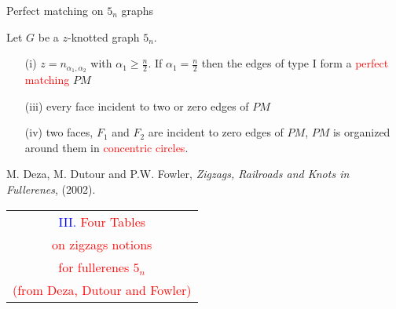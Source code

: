\documentclass[%
pdf,
colorBG,
slideColor,
]{prosper}
\begin{document}
\begin{slide}{Perfect matching on $5_n$ graphs}
\begin{center}
\begin{minipage}{57mm}
{\scriptsize
Let $G$ be a $z$-knotted graph $5_n$. 
\begin{enumerate}
\item[(i)] $z=n_{\alpha_1, \alpha_2}$ with $\alpha_1\geq \frac{n}{2}$. If $\alpha_1=\frac{n}{2}$ then the edges of type I form a \textcolor{red}{perfect matching} $PM$
\item[(iii)] every face incident to two or zero edges of $PM$
\item[(iv)] two faces, $F_1$ and $F_2$ are incident to zero edges of $PM$, $PM$ is organized around them in \textcolor{red}{concentric circles}.
\end{enumerate}
}
\end{minipage}
\begin{minipage}{5.5cm}
\epsfxsize=55mm
\end{minipage}



\end{center}

{\scriptsize

M. Deza, M. Dutour and P.W. Fowler, {\em Zigzags, Railroads and Knots in Fullerenes}, (2002).
}

\end{slide}






\begin{slide}{}
\begin{center}
{\Huge 
\begin{tabular*}{10cm}{c}
\\[-1.2cm]
\textcolor{blue}{III. }\textcolor{red}{Four Tables}\\
\textcolor{red}{on zigzags notions}\\
\textcolor{red}{for fullerenes $5_n$}\\
{\large \textcolor{red}{(from Deza, Dutour and Fowler)}}
\end{tabular*}
}
\end{center}

\end{slide}
\end{document}
